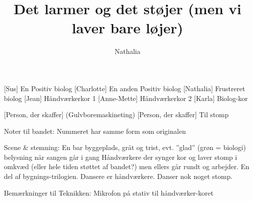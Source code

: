 \documentclass[a4paper,11pt]{article}
\title{Det larmer og det støjer (men vi laver bare løjer)}
\author{Nathalia}
\begin{document}
\maketitle

\begin{roles}
    [Sus] En Positiv biolog
        [Charlotte] En anden Positiv biolog
    [Nathalia] Frustreret biolog
    [Jean] Håndværkerkor 1
    [Anne-Mette] Håndværkerkor 2
    [Karla] Biolog-kor
\end{roles}

\begin{props}
    [Person, der skaffer] (Gulvboremaskineting)
    [Person, der skaffer] Til stomp
\end{props}

\scene
Noter til bandet:
Nummeret har samme form som originalen

Scene \& stemning:
En bar byggeplads, gråt og trist, evt. ”glad” (grøn = biologi) belysning når sangen går i gang
Håndværkere der synger kor og laver stomp i omkvæd (eller hele tiden støttet af bandet?) men ellers går rundt og arbejder.
En del af bygnings-trilogien.
Dansere er håndværkere. Danser nok noget stomp.

Bemærkninger til Teknikken:
Mikrofon på stativ til håndværker-koret
\end{document}
